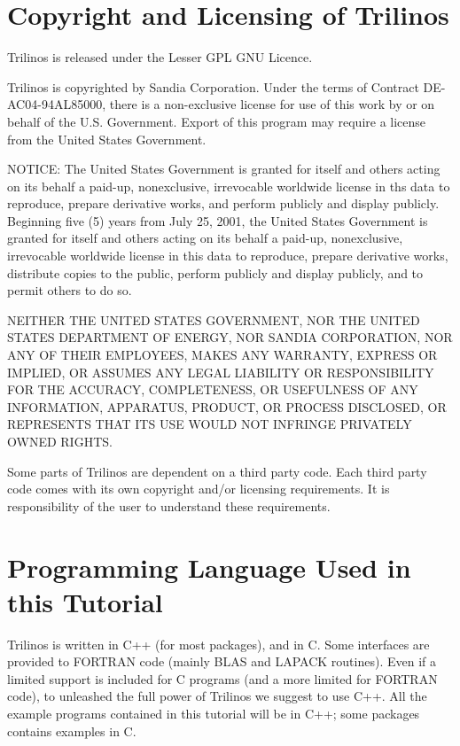 
\section{Copyright and Licensing of Trilinos}
\label{sec:copyright}

Trilinos is released under the Lesser GPL GNU Licence.

Trilinos is copyrighted by Sandia Corporation. Under the terms of
Contract DE-AC04-94AL85000, there is a non-exclusive license for use of
this work by or on behalf of the U.S. Government.  Export of this
program may require a license from the United States Government.

NOTICE: The United States Government is granted for itself and others
acting on its behalf a paid-up, nonexclusive, irrevocable worldwide
license in ths data to reproduce, prepare derivative works, and perform
publicly and display publicly.  Beginning five (5) years from July 25,
2001, the United States Government is granted for itself and others
acting on its behalf a paid-up, nonexclusive, irrevocable worldwide
license in this data to reproduce, prepare derivative works, distribute
copies to the public, perform publicly and display publicly, and to
permit others to do so.

NEITHER THE UNITED STATES GOVERNMENT, NOR THE UNITED STATES DEPARTMENT
OF ENERGY, NOR SANDIA CORPORATION, NOR ANY OF THEIR EMPLOYEES, MAKES ANY
WARRANTY, EXPRESS OR IMPLIED, OR ASSUMES ANY LEGAL LIABILITY OR
RESPONSIBILITY FOR THE ACCURACY, COMPLETENESS, OR USEFULNESS OF ANY
INFORMATION, APPARATUS, PRODUCT, OR PROCESS DISCLOSED, OR REPRESENTS
THAT ITS USE WOULD NOT INFRINGE PRIVATELY OWNED RIGHTS.

\medskip

Some parts of Trilinos are dependent on a third party code. Each third
party code comes with its own copyright and/or licensing requirements.
It is responsibility of the user to understand these requirements.


\section{Programming Language Used in this Tutorial}
\label{sec:language}

Trilinos is written in C++ (for most packages), and in C. Some
interfaces are provided to FORTRAN code (mainly BLAS and LAPACK
routines). Even if a limited support is included for C programs (and a
more limited for FORTRAN code), to unleashed the full power of Trilinos
we suggest to use C++. All the example programs contained in this
tutorial will be in C++; some packages contains examples in C.

